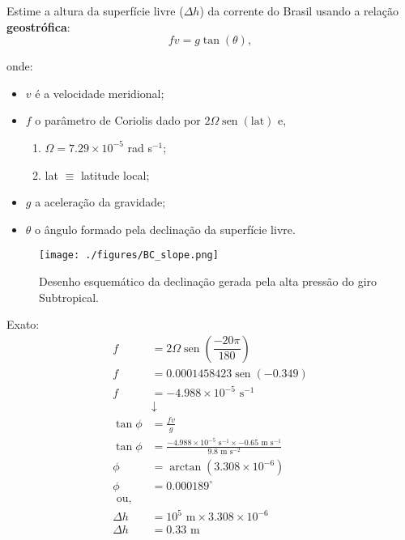 \documentclass[letterpaper,portuguese,12pt,pdftex]{exam}
\newcommand{\sen}{\operatorname{sen}}
\begin{document}
\begin{questions}
Estime a altura da superfície livre ($\Delta h$) da corrente do Brasil usando a
relação {\bf geostrófica}:
 \[
    fv = g\tan(\theta),
 \]


onde:
\begin{itemize}
 \item $v$ é a velocidade meridional;
 \item $f$ o parâmetro de Coriolis dado por $2\Omega\sen(\text{lat})$ e,
  \begin{enumerate}
   \item[] $\Omega = 7.29 \times 10^{-5}$ rad s$^{-1}$;
   \item[] lat $\equiv$ latitude local;
  \end{enumerate}

 \item $g$ a aceleração da gravidade;
 \item $\theta$ o ângulo formado pela declinação da superfície livre.
\end{itemize}

\begin{figure}[ht]
  \centering
  \texttt{[image: ./figures/BC\_slope.png]}
  \caption{Desenho esquemático da declinação gerada pela alta pressão do giro
           Subtropical.}
  \label{fig:BC}
\end{figure}


\begin{solution}
  Exato:
\begin{align*}
  f &= 2\Omega\sen\left( \dfrac{-20 \pi}{180} \right) \\
  f &= 0.0001458423 \sen(-0.349)\\
  f &= -4.988\times 10^{-5} \text { s}^{-1}\\
  &\downarrow\\
 \tan\phi &= \frac{fv}{g}\\
 \tan\phi &= \frac{-4.988\times 10^{-5} \text { s}^{-1} \times -0.65 \text{ m s}^{-1}}{9.8 \text{ m s}^{-2}}\\
  \phi &= \arctan({3.308 \times 10^{-6}})\\
  \phi &=0.000189^{\circ}\\
  \text{ ou,}\\
 \Delta h &= 10^5\text{ m} \times 3.308 \times 10^{-6}\\
 \Delta h &= 0.33 \text{ m}
\end{align*}


\end{solution}
\end{questions}
\end{document}
